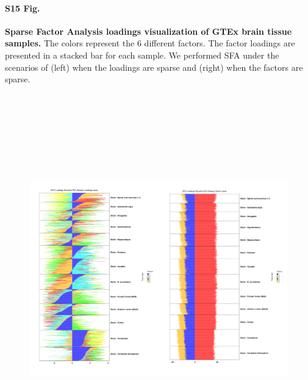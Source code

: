 \documentclass[10pt,letterpaper]{article}
\begin{document}
\paragraph*{S15 Fig.}

\label{figS15}
{\bf Sparse Factor Analysis loadings visualization of GTEx brain tissue samples.} The colors represent the 6 different factors. The factor loadings are presented in a stacked bar for each sample. We performed SFA under the scenarios of (left) when the loadings are sparse and (right) when the factors are sparse.

\begin{figure}[ht]
\centering
\includegraphics[height=6.3in, width=7in]{../../plots/gtex-figures/gtex_sfa_brain.jpeg}
\end{figure}
\end{document}
